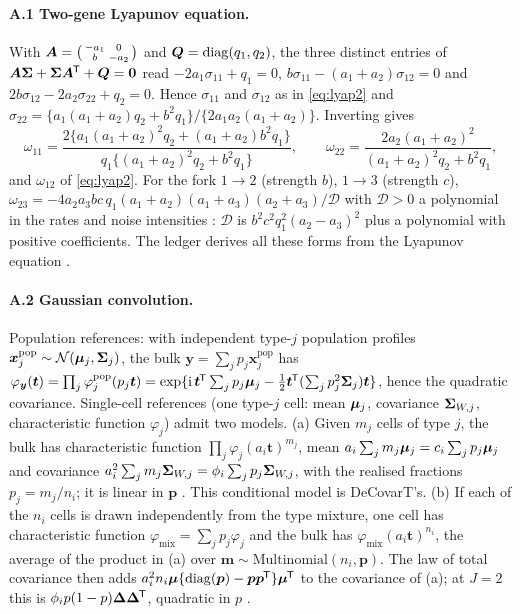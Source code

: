 \documentclass[11pt,a4paper]{article}
\begin{document}
\paragraph{A.1 Two-gene Lyapunov equation.}\label{app:lyap} With $\bm A=\begin{psmallmatrix}-a_1&0\\
b&-a_2\end{psmallmatrix}$ and $\bm Q=\operatorname{diag}(q_1,q_2)$, the three distinct entries of $\bm A\bm{\Sigma}+\bm{\Sigma}
\bm A^{\mkern-1.5mu\mathsf{T}}+\bm Q=\bm 0$ read $-2a_1\sigma_{11}+q_1=0$, $b\sigma_{11}-(a_1+a_2)\sigma_{12}=0$ and
$2b\sigma_{12}-2a_2\sigma_{22}+q_2=0$. Hence $\sigma_{11}$ and $\sigma_{12}$ as in \cref{eq:lyap2} and
$\sigma_{22}=\{a_1(a_1+a_2)q_2+b^2q_1\}/\{2a_1a_2(a_1+a_2)\}$. Inverting gives
\[
\omega_{11}=\frac{2\{a_1(a_1+a_2)^2q_2+(a_1+a_2)b^2q_1\}}{q_1\{(a_1+a_2)^2q_2+b^2q_1\}},\qquad
\omega_{22}=\frac{2a_2(a_1+a_2)^2}{(a_1+a_2)^2q_2+b^2q_1},
\]
and $\omega_{12}$ of \cref{eq:lyap2}. For the fork $1\to2$ (strength $b$), $1\to3$ (strength $c$),
$\omega_{23}=-4a_2a_3bc\,q_1(a_1+a_2)(a_1+a_3)(a_2+a_3)/\mathcal D$ with $\mathcal D>0$ a polynomial in the
rates and noise intensities : $\mathcal D$ is $b^2c^2q_1^2(a_2-a_3)^2$ plus a polynomial with
positive coefficients. The ledger derives all these forms from the Lyapunov equation .

\paragraph{A.2 Gaussian convolution.}\label{app:conv} Population references: with independent type-$j$
population profiles $\bm x^{\mathrm{pop}}_j\sim\mathcal N(\bm{\mu}_j,\bm{\Sigma}_j)$, the bulk
$\bm y=\sum_jp_j\bm x^{\mathrm{pop}}_j$ has $\varphi_{\bm y}(\bm t)=\prod_j\varphi^{\mathrm{pop}}_j(p_j\bm t)
=\exp\{\mathrm i\,\bm t^{\mkern-1.5mu\mathsf{T}}\sum_jp_j\bm{\mu}_j-\tfrac12\bm t^{\mkern-1.5mu\mathsf{T}}(\sum_jp_j^2\bm{\Sigma}_j)\bm t\}$, hence the
quadratic covariance. Single-cell references (one type-$j$ cell: mean $\bm{\mu}_j$, covariance $\bm{\Sigma}_{W,j}$,
characteristic function $\varphi_j$) admit two models. (a) Given $m_j$ cells of type $j$, the bulk has characteristic function $\prod_j\varphi_j(a_i\bm t)^{m_j}$, mean
$a_i\sum_jm_j\bm{\mu}_j=c_i\sum_jp_j\bm{\mu}_j$ and covariance $a_i^2\sum_jm_j\bm{\Sigma}_{W,j}=\phi_i\sum_jp_j\bm{\Sigma}_{W,j}$, with the
realised fractions $p_j=m_j/n_i$; it is linear in $\bm p$ . This conditional model is
DeCovarT's. (b) If each of the $n_i$ cells is drawn independently from the type mixture, one cell has
characteristic function $\varphi_{\mathrm{mix}}=\sum_jp_j\varphi_j$ and the bulk has
$\varphi_{\mathrm{mix}}(a_i\bm t)^{n_i}$, the average of the product in (a) over
$\bm m\sim\mathrm{Multinomial}(n_i,\bm p)$. The law of total covariance then adds
$a_i^2n_i\bm{\mu}\{\operatorname{diag}(\bm p)-\bm p\bm p^{\mkern-1.5mu\mathsf{T}}\}\bm{\mu}^{\mkern-1.5mu\mathsf{T}}$ to the covariance of (a); at $J=2$ this is
$\phi_ip(1-p)\bm\Delta\bm\Delta^{\mkern-1.5mu\mathsf{T}}$, quadratic in $p$ .
\end{document}
